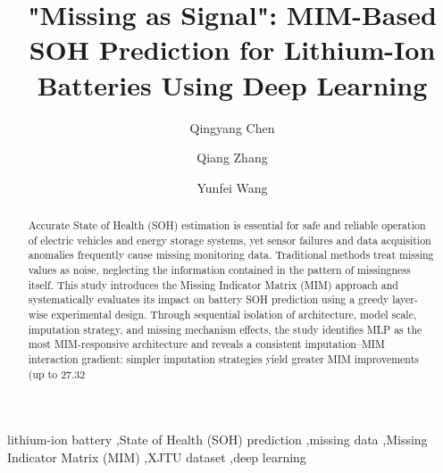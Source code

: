 \documentclass[5p,times]{elsarticle}
\begin{document}
\begin{frontmatter}

\title{"Missing as Signal": MIM-Based SOH Prediction for Lithium-Ion Batteries Using Deep Learning}

\author[inst1]{Qingyang Chen}
\author[inst1]{Qiang Zhang}
\author[inst2]{Yunfei Wang}

\address[inst1]{School of Nuclear Science and Energy Engineering, Shandong University, Jinan 250061, China}
\address[inst2]{Shandong Supermaly Generating Equipment Co., Ltd, No.5153 Yingqian Street, Hi-technology Development Zone, Weifang 261061, Shandong, China}

\begin{abstract}
Accurate State of Health (SOH) estimation is essential for safe and reliable operation of electric vehicles and energy storage systems, yet sensor failures and data acquisition anomalies frequently cause missing monitoring data. Traditional methods treat missing values as noise, neglecting the information contained in the pattern of missingness itself. This study introduces the Missing Indicator Matrix (MIM) approach and systematically evaluates its impact on battery SOH prediction using a greedy layer-wise experimental design. Through sequential isolation of architecture, model scale, imputation strategy, and missing mechanism effects, the study identifies MLP as the most MIM-responsive architecture and reveals a consistent imputation--MIM interaction gradient: simpler imputation strategies yield greater MIM improvements (up to 27.32%
\end{abstract}

\begin{keyword}
lithium-ion battery \sep State of Health (SOH) prediction \sep missing data \sep Missing Indicator Matrix (MIM) \sep XJTU dataset \sep deep learning
\end{keyword}

\end{frontmatter}
\end{document}
